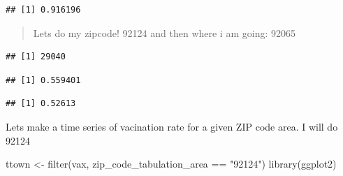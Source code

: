 \documentclass[
]{article}
\newenvironment{Shaded}{\begin{snugshade}}{\end{snugshade}}
\newcommand{\FunctionTok}[1]{\textcolor[rgb]{0.00,0.00,0.00}{#1}}
\newcommand{\NormalTok}[1]{#1}
\newcommand{\OtherTok}[1]{\textcolor[rgb]{0.56,0.35,0.01}{#1}}
\newcommand{\SpecialCharTok}[1]{\textcolor[rgb]{0.00,0.00,0.00}{#1}}
\newcommand{\StringTok}[1]{\textcolor[rgb]{0.31,0.60,0.02}{#1}}
\begin{document}
\begin{verbatim}
## [1] 0.916196
\end{verbatim}

\begin{quote}
Lets do my zipcode! 92124 and then where i am going: 92065
\end{quote}

\begin{Shaded}
\end{Shaded}

\begin{verbatim}
## [1] 29040
\end{verbatim}

\begin{Shaded}
\end{Shaded}

\begin{verbatim}
## [1] 0.559401
\end{verbatim}

\begin{Shaded}
\end{Shaded}

\begin{verbatim}
## [1] 0.52613
\end{verbatim}

Lets make a time series of vacination rate for a given ZIP code area. I
will do 92124

\begin{Shaded}
\begin{Highlighting}[]
\NormalTok{ttown }\OtherTok{\textless{}{-}} \FunctionTok{filter}\NormalTok{(vax, zip\_code\_tabulation\_area }\SpecialCharTok{==} \StringTok{"92124"}\NormalTok{)}
\FunctionTok{library}\NormalTok{(ggplot2)}
\end{Highlighting}
\end{Shaded}
\end{document}
